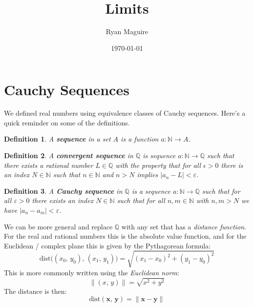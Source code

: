 \documentclass{article}
\title{Limits}
\author{Ryan Maguire}
\date{\today}
\theoremstyle{normal}
\newtheorem{definition}{Definition}
\begin{document}
    \maketitle
    \section{Cauchy Sequences}
        We defined real numbers using equivalence classes of Cauchy
        sequences. Here's a quick reminder on some of the definitions.
        \begin{definition}
            A \textbf{sequence} in a set $A$ is a function
            $a:\mathbb{N}\rightarrow{A}$.
        \end{definition}
        \begin{definition}
            A \textbf{convergent sequence} in
            $\mathbb{Q}$ is sequence $a:\mathbb{N}\rightarrow\mathbb{Q}$ such
            that there exists a rational number $L\in\mathbb{Q}$ with the
            property that for all $\epsilon>0$ there is an index
            $N\in\mathbb{N}$ such that $n\in\mathbb{N}$ and $n>N$ implies
            $|a_{n}-L|<\varepsilon$.
        \end{definition}
        \begin{definition}
            A \textbf{Cauchy sequence} in $\mathbb{Q}$ is a sequence
            $a:\mathbb{N}\rightarrow\mathbb{Q}$ such that for all
            $\varepsilon>0$ there exists an index $N\in\mathbb{N}$ such that
            for all $n,m\in\mathbb{N}$ with $n,m>N$ we have
            $|a_{n}-a_{m}|<\varepsilon$.
        \end{definition}
        We can be more general and replace $\mathbb{Q}$ with any set that has
        a \textit{distance function}. For the real and rational numbers this
        is the absolute value function, and for the Euclidean / complex plane
        this is given by the Pythagorean formula:
        \begin{equation}
            \textrm{dist}\Big((x_{0},\,y_{0}),\,(x_{1},\,y_{1})\Big)
            =\sqrt{(x_{1}-x_{0})^{2}+(y_{1}-y_{0})^{2}}
        \end{equation}
        This is more commonly written using the \textit{Euclidean norm}:
        \begin{equation}
            \|(x,\,y)\|=\sqrt{x^{2}+y^{2}}
        \end{equation}
        The distance is then:
        \begin{equation}
            \textrm{dist}(\mathbf{x},\,\mathbf{y})
            =\|\mathbf{x}-\mathbf{y}\|
        \end{equation}
\end{document}
